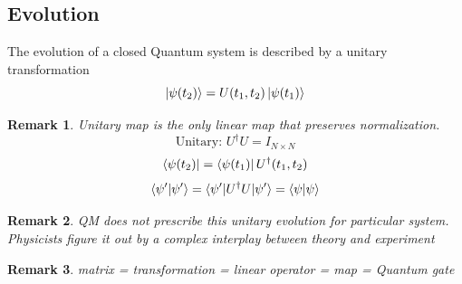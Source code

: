 \documentclass[]{book}
\newtheorem*{remark}{Remark}
\theoremstyle{nonumberplain}
\begin{document}
\subsection{Evolution}
\begin{postu}[2]
The evolution of a closed Quantum system is described by a unitary transformation
\[
	\ket{\psi(t_{2})}=U(t_{1},t_{2})\ket{\psi(t_{1})}
\]
\end{postu}
\begin{remark}
    Unitary map is the only linear map that preserves normalization. 
    \[
     \text{Unitary: } U^{\dagger}U = I_{N\times N}
    \]
    \[
     \bra{\psi(t_{2})} = \bra{\psi(t_{1})}U^{\dagger}(t_{1},t_{2})
    \]
    \[
    \braket{\psi^{\prime}|\psi^{\prime}}=\braket{\psi^{\prime}|U^{\dagger}U|\psi^{\prime}}
    =\braket{\psi|\psi}
    \]
\end{remark}
\begin{remark}
	QM does not prescribe this unitary evolution for particular system. Physicists figure it out by a complex interplay between theory and experiment
\end{remark}
\begin{remark}
matrix = transformation = linear operator = map = Quantum gate
\end{remark}
\end{document}
